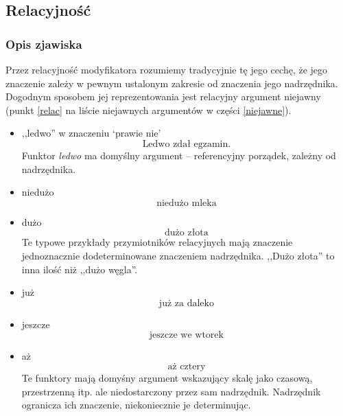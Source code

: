 \documentclass[a4paper, 12pt]{article}
\theoremstyle{remark}
\begin{document}
\subsection{Relacyjność}
{
\renewcommand\thesubsection{}
\renewcommand\thesubsubsection{}
\setcounter{subsection}{-1}
\subsubsection{Opis zjawiska} %
\label{sub:opis_zjawiska1}
}

Przez relacyjność modyfikatora rozumiemy tradycyjnie tę jego cechę, że jego znaczenie zależy w pewnym ustalonym zakresie od znaczenia jego nadrzędnika. Dogodnym sposobem jej reprezentowania jest relacyjny argument niejawny (punkt \ref{relac} na liście niejawnych argumentów w części \ref{niejawne}).

\begin{itemize}
\item ,,ledwo'' w znaczeniu `prawie nie'
\begin{equation}
	\text{Ledwo zdał egzamin}.
\end{equation}
Funktor \emph{ledwo} ma domyślny argument -- referencyjny porządek, zależny od nadrzędnika.
\item niedużo
\begin{equation}
	\text{niedużo mleka}
\end{equation}
\item dużo
\begin{equation}
	\text{dużo złota}
\end{equation}
Te typowe przykłady przymiotników relacyjnych mają znaczenie jednoznacznie dodeterminowane znaczeniem nadrzędnika. 
,,Dużo złota'' to inna ilość niż ,,dużo węgla''.
\item już
\begin{equation}
	\text{już za daleko}
\end{equation}
\item jeszcze
\begin{equation}
	\text{jeszcze we wtorek}
\end{equation}
\item aż
\begin{equation}
	\text{aż cztery}
\end{equation}
Te funktory mają domyśny argument wskazujący skalę jako czasową, przestrzenną itp. ale niedostarczony przez sam nadrzędnik.
Nadrzędnik ogranicza ich znaczenie, niekoniecznie je determinując. 
\end{itemize}
\end{document}
